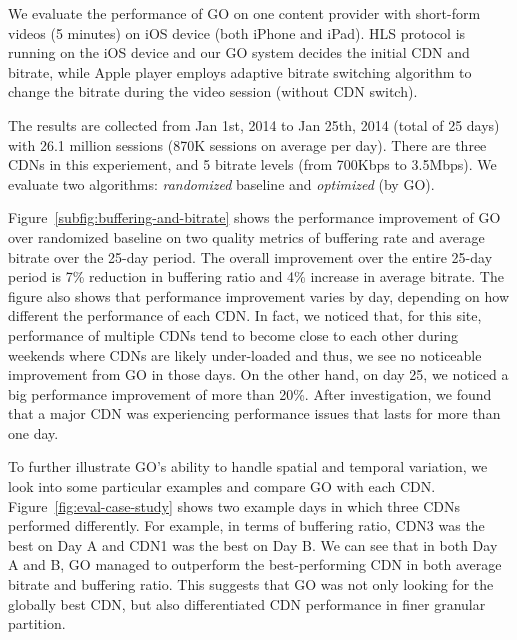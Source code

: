 \label{subsec:eval_setup}

We evaluate the performance of GO on one content provider with short-form videos (5 minutes) on iOS device (both iPhone and iPad). 
HLS protocol is running on the iOS device and our GO system decides the initial CDN and bitrate, while Apple player employs adaptive 
bitrate switching algorithm to change the bitrate during the video session (without CDN switch). 

The results are collected from Jan 1st, 2014 to Jan 25th, 2014 (total of 25 days) with 26.1 million sessions (870K sessions on average per day).
There are three CDNs in this experiement, and 5 bitrate levels (from 700Kbps to 3.5Mbps). We evaluate two algorithms: {\it randomized} baseline and {\it optimized} (by GO).

\label{subsec:real-world-improvement}

Figure~\ref{subfig:buffering-and-bitrate} shows the performance improvement of GO over randomized baseline on two quality metrics of
buffering rate and average bitrate over the 25-day period. The overall improvement over the entire 25-day period is 7\% reduction in buffering ratio and 4\% increase in 
average bitrate. The figure also shows that performance improvement varies by day, depending on how different the performance of each CDN. 
In fact, we noticed that, for this site, performance of multiple CDNs tend to become close to each other
during weekends where CDNs are likely under-loaded and thus, we see no noticeable improvement from GO in those days. 
On the other hand, on day 25, we noticed a big performance improvement of more than 20\%. After investigation,
we found that a major CDN was experiencing performance issues that lasts for more than one day. 

To further illustrate GO's ability to handle spatial and temporal variation, 
we look into some particular examples and compare GO with each CDN. Figure~\ref{fig:eval-case-study} shows two example days in which three CDNs performed differently.  For example, in terms of buffering ratio, CDN3 was the best on Day A and CDN1 was the best on Day B. 
We can see that in both Day A and B, GO managed to outperform the best-performing CDN in both average bitrate 
and buffering ratio. This suggests that GO was not only looking for the globally best CDN, but also 
differentiated CDN performance in finer granular partition.


